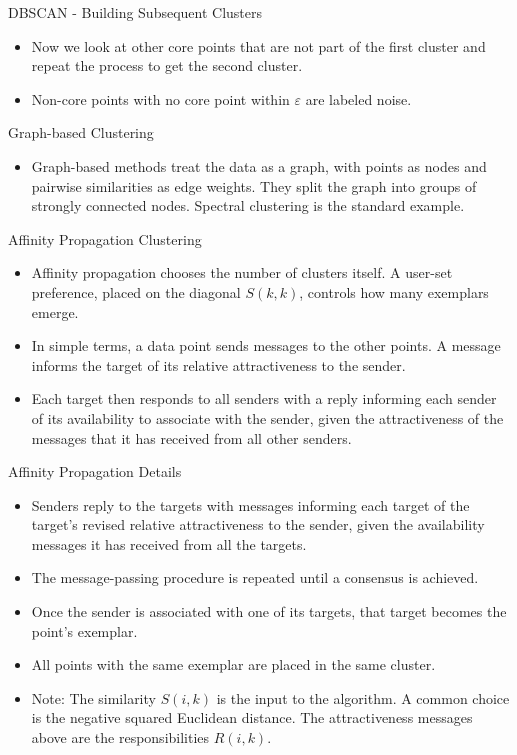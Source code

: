 \documentclass[aspectratio=169,xcolor=dvipsnames,svgnames,x11names,fleqn]{beamer}
\begin{document}
\begin{frame}{DBSCAN - Building Subsequent Clusters}
    \begin{itemize}
    \item Now we look at other core points that are not part of the first cluster and repeat the process to get the second cluster.
    \item Non-core points with no core point within $\varepsilon$ are labeled noise.
\end{itemize}
\end{frame}

\begin{frame}{Graph-based Clustering}
    \begin{itemize}
  \item Graph-based methods treat the data as a graph, with points as nodes and pairwise similarities as edge weights. They split the graph into groups of strongly connected nodes. Spectral clustering is the standard example.
\end{itemize}
\end{frame}


\begin{frame}{Affinity Propagation Clustering}
    \begin{itemize}
\item Affinity propagation chooses the number of clusters itself. A user-set preference, placed on the diagonal $S(k,k)$, controls how many exemplars emerge.
\item In simple terms, a data point sends messages to the other points. A message informs the target of its relative attractiveness to the sender.
    \item Each target then responds to all senders with a reply informing each sender of its availability to associate with the sender, given the attractiveness of the messages that it has received from all other senders.
\end{itemize}
\end{frame}

\begin{frame}{Affinity Propagation Details}
    \begin{itemize}
    \item Senders reply to the targets with messages informing each target of the target's revised relative attractiveness to the sender, given the availability messages it has received from all the targets.
    \item The message-passing procedure is repeated until a consensus is achieved.
    \item Once the sender is associated with one of its targets, that target becomes the point's exemplar.
    \item All points with the same exemplar are placed in the same cluster.
\item Note: The similarity $S(i,k)$ is the input to the algorithm. A common choice is the negative squared Euclidean distance. The attractiveness messages above are the responsibilities $R(i,k)$.
\end{itemize}
\end{frame}
\end{document}
